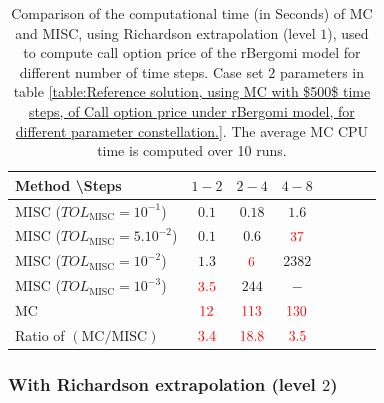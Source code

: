 \begin{table}[h!]
	\centering
	\begin{tabular}{l*{6}{c}r}
		Method \textbackslash  Steps            & $1-2$ & $2-4$ & $4-8$   \\
		\hline
		MISC ($TOL_{\text{MISC}}=10^{-1}$)  & $0.1$ & $0.18$ & $1.6$  \\
		MISC ($TOL_{\text{MISC}}=5.10^{-2}$)  & $0.1$ & $0.6$ & ${\color{red}37}$  \\
		MISC ($TOL_{\text{MISC}}=10^{-2}$)  & $1.3$ & ${\color{red}6}$ & $2382$  \\
		MISC ($TOL_{\text{MISC}}=10^{-3}$)  & ${\color{red}3.5}$ & $ 244$ & $-$   \\
		
		\hline	
		MC  &${\color{red}12}$ & ${\color{red}113}$  & ${\color{red}130}$   \\
		
		\hline	
		Ratio of $\left(\text{MC}/ \text{MISC} \right)$  &${\color{red} 3.4
		}$ & ${\color{red}     18.8
		}$  & ${\color{red} 3.5}
		$  \\
		\hline
		\end{tabular}
		\caption{Comparison of the computational time (in Seconds) of  MC and MISC, using Richardson extrapolation (level $1$), used to compute call option price of the rBergomi model for different number of time steps. Case set $2$ parameters in table \ref{table:Reference solution, using MC with $500$ time steps, of Call option price under rBergomi model, for different parameter constellation.}. The
			average MC CPU time is computed over 10 runs.}
		\label{Comparsion of the computational time of  MC and MISC, using Richardson extrapolation (level $1$), used to compute Call option price of rBergomi model for different number of time steps. Case set $2$ parameters,linear}
		\end{table}
		
		\FloatBarrier
	\subsubsection*{With Richardson extrapolation (level $2$)}
		

